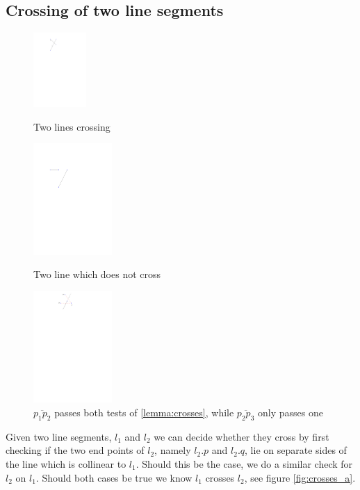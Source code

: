 \subsection{Crossing of two line segments}

\begin{figure}[H]
		\includegraphics[width=2cm]{figures/crosses.pdf}
		\caption{Two lines crossing}
		\label{fig:crosses_a}
	\endminipage\hfill
		\includegraphics[width=3cm]{figures/crosses1.pdf}
		\caption{Two line which does not cross}
		\label{fig:crosses_b}
	\endminipage\hfill
		\includegraphics[width=3cm]{figures/crosses2.pdf}
		\caption{$\overline{p_1p_2}$ passes both tests of \ref{lemma:crosses}, while $\overline{p_2p_3}$ only passes one}
		\label{fig:crosses_c}
		\endminipage\hfill
\end{figure}

\begin{Lemma} \label{lemma:crosses}
    Given two line segments, $l_1$ and $l_2$ we can decide whether they cross
    by first checking if the two end points of $l_2$, namely $l_2.p$ and $l_2.q$, 
    lie on separate sides of the line which is collinear to $l_1$. Should this be
    the case, we do a similar check for $l_2$ on $l_1$. Should both cases be true
    we know $l_1$ crosses $l_2$, see figure \ref{fig:crosses_a}.
\end{Lemma}

